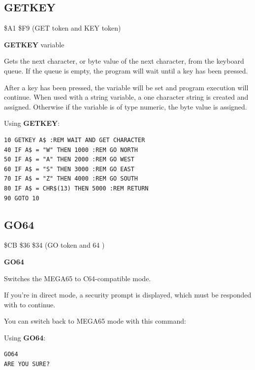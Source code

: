 \subsection{GETKEY}
\begin{description}[leftmargin=2cm,style=nextline]
\item [Token:] \$A1 \$F9 (GET token and KEY token)
\item [Format:] {\bf GETKEY} variable
\item [Usage:] Gets the next character, or byte value of the next character,
               from the keyboard queue. If the queue is empty,
               the program will wait until a key has been pressed.

               After a key has been pressed, the variable will be set
               and program execution will continue. When used with
               a string variable, a one character string is created and assigned.
               Otherwise if the variable is of type numeric, the byte value
               is assigned.

\item [Example:] Using {\bf GETKEY}:
\begin{tcolorbox}[colback=black,coltext=white]
\verbatimfont{\codefont}
\begin{verbatim}
10 GETKEY A$ :REM WAIT AND GET CHARACTER
40 IF A$ = "W" THEN 1000 :REM GO NORTH
50 IF A$ = "A" THEN 2000 :REM GO WEST
60 IF A$ = "S" THEN 3000 :REM GO EAST
70 IF A$ = "Z" THEN 4000 :REM GO SOUTH
80 IF A$ = CHR$(13) THEN 5000 :REM RETURN
90 GOTO 10
\end{verbatim}
\end{tcolorbox}
\end{description}


\newpage
\subsection{GO64}
\begin{description}[leftmargin=2cm,style=nextline]
\item [Token:] \$CB \$36 \$34 (GO token and 64 )
\item [Format:] {\bf GO64}
\item [Usage:] Switches the
               MEGA65 to C64-compatible mode.

               If you're in direct
               mode, a security prompt 
               is displayed, which must be responded with  to
               continue.

               You can switch back to MEGA65 mode with this command: 

\item [Example:] Using {\bf GO64}:
\begin{tcolorbox}[colback=black,coltext=white]
\verbatimfont{\codefont}
\begin{verbatim}
GO64
ARE YOU SURE?
\end{verbatim}
\end{tcolorbox}
\end{description}

